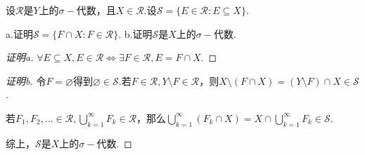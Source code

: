 \begin{comment}
    \begin{problem}[10]\label{2.B.10}
        证明：所有在十进制表示下的有无穷位是\(5\)的实数构成了一个borel集合.
    \end{problem}

    \begin{proof}
        给出实数\(x\)的十进制表示\([a_N \dots a_0. a_{-1} \dots], x=\sum_{i=-\infty}^N a_i 10^i\).

        此时题设集合\(A=\{x=[a_N \dots a_0. a_{-1} \dots]: \limsup_{i \to -\infty}\chi_{a_i=5}=1\}\).

        据上极限的定义，设\(B_i=\{x=[a_N \dots a_0. a_{-1} \dots]: a_i=5\}\)，则\(A=\bigcap_{n=1}^\infty \bigcup_{i=n}^\infty B_i\).
        \begin{align*}
            B_i=\bigcup_{a_N, \dots, a_{i-1}} \left[\sum_{k=i-1}^N a_k 10^k +5 \cdot 10^i,\right. \left.\sum_{k=i-1}^N a_k 10^k +6 \cdot 10^i\right)
        \end{align*}
        作为区间的可数并，\(B_i\)是\textit{borel}集，因此\(A=\bigcap_{n=1}^\infty \bigcup_{i=n}^\infty B_i\)也是\textit{borel}集.
    \end{proof}
\end{comment}

\begin{problem}[11]\label{2.B.11}
    设\(\mathcal{R}\)是\(Y\)上的\(\sigma-\)代数，且\(X \in \mathcal{R}\).设\(\mathcal{S}=\{E \in \mathcal{R}: E \subseteq X\}\).

    a.证明\(\mathcal{S}=\{F \cap X: F \in \mathcal{R}\}\). \quad b.证明\(\mathcal{S}\)是\(X\)上的\(\sigma-\)代数.
\end{problem}

\begin{proof}[证明a]
    \(\forall E \subseteq X, E \in \mathcal{R} \Longleftrightarrow \exists F \in \mathcal{R}, E=F \cap X\).
\end{proof}

\begin{proof}[证明b]
    令\(F=\varnothing\)得到\(\varnothing \in \mathcal{S}\).若\(F \in \mathcal{R}, Y \setminus F \in \mathcal{R}\)，则\(X \setminus (F \cap X)= (Y \setminus F) \cap X \in \mathcal{S}\).

    若\(F_1, F_2, \dots \in \mathcal{R}, \bigcup_{k=1}^\infty F_k \in \mathcal{R}\)，那么\(\bigcup_{k=1}^\infty (F_k \cap X)=X \cap \bigcup_{k=1}^\infty F_k \in \mathcal{S}\).

    综上，\(\mathcal{S}\)是\(X\)上的\(\sigma-\)代数.
\end{proof}

